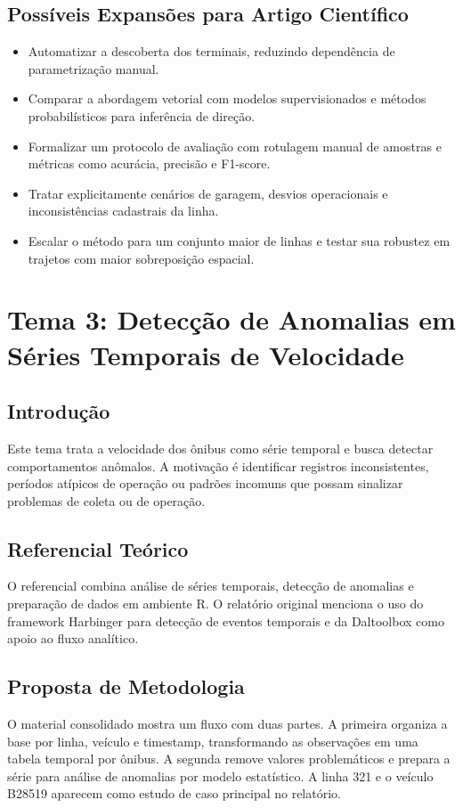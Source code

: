 \documentclass[runningheads]{llncs}
\begin{document}
\subsection{Possíveis Expansões para Artigo Científico}
\begin{itemize}[leftmargin=*]
\item Automatizar a descoberta dos terminais, reduzindo dependência de parametrização manual.
\item Comparar a abordagem vetorial com modelos supervisionados e métodos probabilísticos para inferência de direção.
\item Formalizar um protocolo de avaliação com rotulagem manual de amostras e métricas como acurácia, precisão e F1-score.
\item Tratar explicitamente cenários de garagem, desvios operacionais e inconsistências cadastrais da linha.
\item Escalar o método para um conjunto maior de linhas e testar sua robustez em trajetos com maior sobreposição espacial.
\end{itemize}

\section{Tema 3: Detecção de Anomalias em Séries Temporais de Velocidade}

\subsection{Introdução}
Este tema trata a velocidade dos ônibus como série temporal e busca detectar comportamentos anômalos. A motivação é identificar registros inconsistentes, períodos atípicos de operação ou padrões incomuns que possam sinalizar problemas de coleta ou de operação.

\subsection{Referencial Teórico}
O referencial combina análise de séries temporais, detecção de anomalias e preparação de dados em ambiente R. O relatório original menciona o uso do framework Harbinger para detecção de eventos temporais e da Daltoolbox como apoio ao fluxo analítico.

\subsection{Proposta de Metodologia}
O material consolidado mostra um fluxo com duas partes. A primeira organiza a base por linha, veículo e timestamp, transformando as observações em uma tabela temporal por ônibus. A segunda remove valores problemáticos e prepara a série para análise de anomalias por modelo estatístico. A linha 321 e o veículo B28519 aparecem como estudo de caso principal no relatório.
\end{document}
